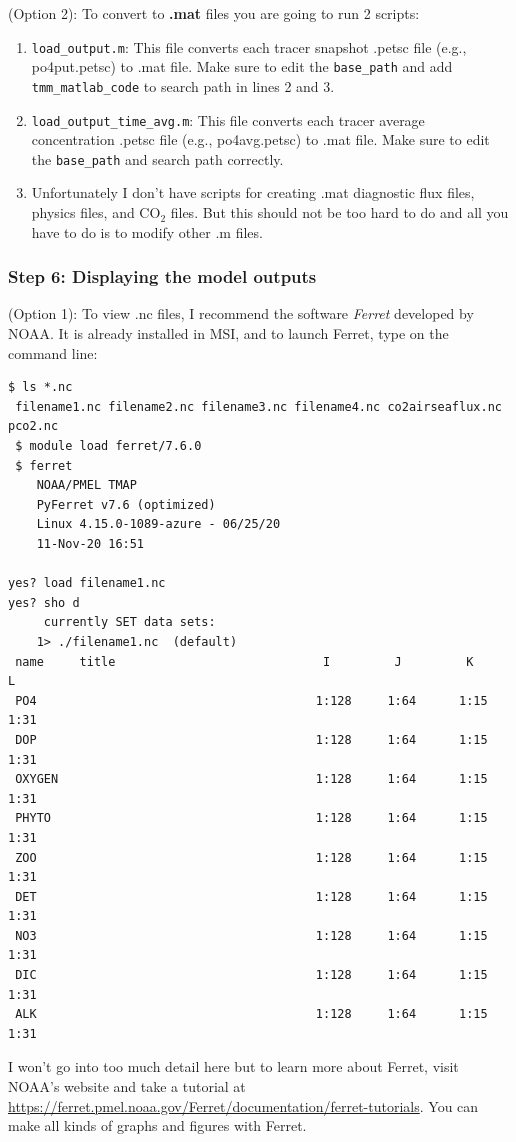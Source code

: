 \documentclass[a4paper]{article}
\def\noin{\noindent }
\begin{document}
\noin (Option 2): To convert to \textbf{.mat} files you are going to run 2 scripts:
\begin{enumerate}

\item \verb|load_output.m|: This file converts each tracer snapshot .petsc file (e.g., po4put.petsc) to .mat file. Make sure to edit the \verb|base_path| and add \verb|tmm_matlab_code| to search path in lines 2 and 3.
\item \verb|load_output_time_avg.m|: This file converts each tracer average concentration .petsc file (e.g., po4avg.petsc) to .mat file. Make sure to edit the \verb|base_path| and search path correctly.
\item Unfortunately I don't have scripts for creating .mat diagnostic flux files, physics files, and $\mathrm{CO_{2}}$ files. But this should not be too hard to do and all you have to do is to modify other .m files.

\end{enumerate}

\subsubsection{Step 6: Displaying the model outputs}
\noin (Option 1): To view .nc files, I recommend the software \emph{Ferret} developed by NOAA. It is already installed in MSI, and to launch Ferret, type on the command line:
\begin{lstlisting}[style=DOS]
 $ ls *.nc
 filename1.nc filename2.nc filename3.nc filename4.nc co2airseaflux.nc pco2.nc
 $ module load ferret/7.6.0
 $ ferret
 	NOAA/PMEL TMAP
 	PyFerret v7.6 (optimized)
 	Linux 4.15.0-1089-azure - 06/25/20
 	11-Nov-20 16:51

yes? load filename1.nc
yes? sho d
     currently SET data sets:
    1> ./filename1.nc  (default)
 name     title                             I         J         K         L
 PO4                                       1:128     1:64      1:15      1:31
 DOP                                       1:128     1:64      1:15      1:31
 OXYGEN                                    1:128     1:64      1:15      1:31
 PHYTO                                     1:128     1:64      1:15      1:31
 ZOO                                       1:128     1:64      1:15      1:31
 DET                                       1:128     1:64      1:15      1:31
 NO3                                       1:128     1:64      1:15      1:31
 DIC                                       1:128     1:64      1:15      1:31
 ALK                                       1:128     1:64      1:15      1:31
\end{lstlisting}
I won't go into too much detail here but to learn more about Ferret, visit NOAA's website and take a tutorial at \url{https://ferret.pmel.noaa.gov/Ferret/documentation/ferret-tutorials}. You can make all kinds of graphs and figures with Ferret.
\end{document}
